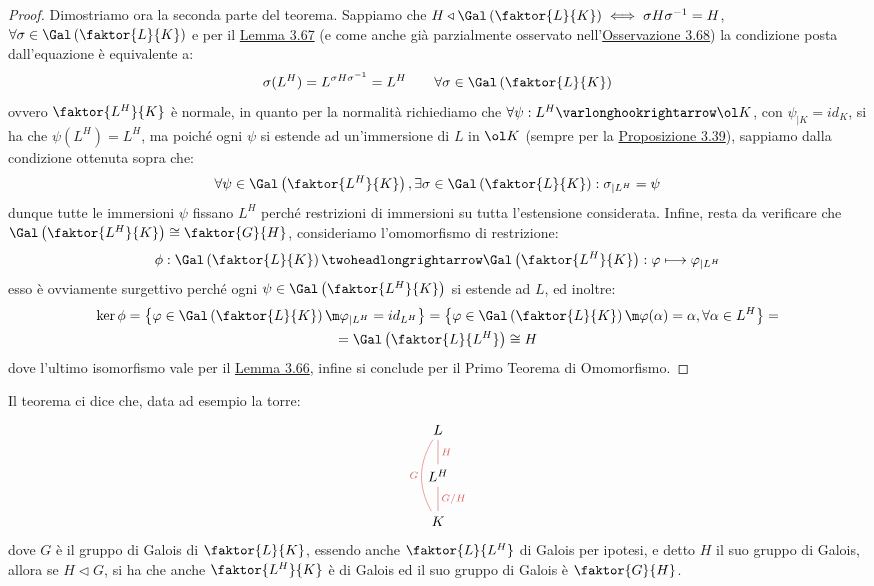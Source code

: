 \documentclass[11pt]{scrartcl}
\begin{document}
\begin{proof}
    Dimostriamo ora la seconda parte del teorema. Sappiamo che $H \triangleleft \Gal\left(\faktor{L}{K}\right) \iff \sigma H\sigma^{-1} = H$, $\forall \sigma \in \Gal\left(\faktor{L}{K}\right)$ e per il 
    \hyperref[3.67]{Lemma 3.67} (e come anche già parzialmente osservato nell'\hyperref[3.68]{Osservazione 3.68}) la condizione posta dall'equazione è equivalente a:
    \[ \sigma(L^H) = L^{\sigma H \sigma^{-1}} = L^H \qquad \forall \sigma \in \Gal\left(\faktor{L}{K}\right)
        \]
    ovvero $\faktor{L^H}{K}$ è normale, in quanto per la normalità richiediamo che $\forall \psi : L^H \varlonghookrightarrow \ol K$, con $\psi_{|K} = id_K$, si ha che $\psi(L^H) = L^H$, ma poiché ogni $\psi$ si estende ad un'immersione 
    di $L$ in $\ol K$ (sempre per la \hyperref[3.39]{Proposizione 3.39}), sappiamo dalla condizione ottenuta sopra che:
    \[ \forall \psi \in \Gal\left(\faktor{L^H}{K}\right), \exists \sigma \in \Gal\left(\faktor{L}{K}\right) : \sigma_{|L^H} = \psi
        \]
    dunque tutte le immersioni $\psi$ fissano $L^H$ perché restrizioni di immersioni su tutta l'estensione considerata.
    Infine, resta da verificare che $\Gal\left(\faktor{L^H}{K}\right) \cong \faktor{G}{H}$, consideriamo l'omomorfismo di restrizione:
    \[ \phi : \Gal\left(\faktor{L}{K}\right) \twoheadlongrightarrow \Gal\left(\faktor{L^H}{K}\right) : \varphi \longmapsto \varphi_{|L^H}
        \]
    esso è ovviamente surgettivo perché ogni $\psi \in \Gal\left(\faktor{L^H}{K}\right)$ si estende ad $L$, ed inoltre:
    \begin{multline*}
        \ker \phi = \left\{\varphi \in \Gal\left(\faktor{L}{K}\right) \m \varphi_{|L^H} = id_{L^H} \right\} = \left\{\varphi \in \Gal\left(\faktor{L}{K}\right) \m \varphi(\alpha) = \alpha, \forall \alpha \in L^H\right\} = \\ 
        = \Gal\left(\faktor{L}{L^H}\right) \cong H
    \end{multline*}
    dove l'ultimo isomorfismo vale per il \hyperref[3.66]{Lemma 3.66}, infine si conclude per il Primo Teorema di Omomorfismo.
\end{proof}

\begin{example}
    Il teorema ci dice che, data ad esempio la torre:
    \[\begin{tikzcd}
        L \\
        {L^H} \\
        K
        \arrow["G", color={rgb,255:red,214;green,92;blue,92}, bend left, no head, from=3-1, to=1-1]
        \arrow["{G/H}"', color={rgb,255:red,214;green,92;blue,92}, no head, from=3-1, to=2-1]
        \arrow["H"', color={rgb,255:red,214;green,92;blue,92}, no head, from=2-1, to=1-1]
    \end{tikzcd}\]
    dove $G$ è il gruppo di Galois di $\faktor{L}{K}$, essendo anche $\faktor{L}{L^H}$ di Galois 
    per ipotesi, e detto $H$ il suo gruppo di Galois, allora se $H \triangleleft G$,
    si ha che anche $\faktor{L^H}{K}$ è di Galois ed il suo gruppo di Galois è $\faktor{G}{H}$.
\end{example}
\end{document}
